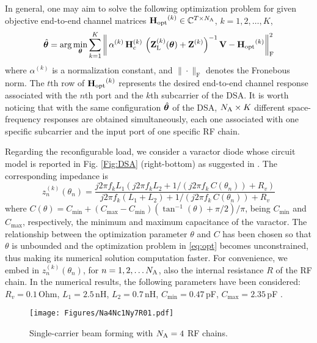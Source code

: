 \documentclass[10pt, final, twocolumn, twoside, romanappendices]{IEEEtran}
\begin{document}
In general, one may aim to solve the following  optimization problem for given objective end-to-end channel matrices  ${\bf{H}_{\mathrm{opt}}}^{(k)} \in \mathbb{C}^{T \times N_{\text{A}}}$, $k=1,2, \ldots, K$,   
%
\begin{equation} \label{eq:opt}
\hat{\boldsymbol{\theta}}=\arg \min_{\boldsymbol{\theta}} \sum_{k=1}^K \left\|\, \alpha^{(k)} \, {\bf{H}}_c^{(k)} \,   \left ( {\bf{Z}}_{\text{L}}^{(k)}(\boldsymbol{\theta})  +{\bf{Z}}^{(k)}  \right )^{-1} {\bf{V}} -   {\bf{H}_{\mathrm{opt}}}^{(k)} \right\|^2_{\mathrm{F}}   
\end{equation}
%
where $\alpha^{(k)}$ is a normalization constant, and $\| \cdot \|_{\mathrm{F}}$ denotes the Fronebous norm.
The $t$th row of ${\bf{H}_{\mathrm{opt}}}^{(k)}$ represents the desired end-to-end channel response associated with the $n$th port and the $k$th subcarrier of the \ac{DSA}. It is worth noticing that with the same configuration $\hat{\boldsymbol{\theta}}$ of the \ac{DSA}, $N_{\text{A}} \times K$ different space-frequency responses are obtained simultaneously, each one associated with one specific subcarrier and the input port of one specific \ac{RF} chain.  
 
Regarding the reconfigurable load, we consider a varactor diode whose circuit model is reported in Fig. \ref{Fig:DSA} (right-bottom) as suggested in  \cite{SamRuiQinCha:20}. 
The corresponding impedance is
%
\begin{equation}
z_n^{(k)}(\theta_n)=\frac{j 2 \pi f_k L_1 (j 2 \pi f_k  L_2+1/(j 2 \pi f_k \, C(\theta_n))+R_v)}{j 2 \pi f_k (L_1+L_2)+1/(j 2 \pi f_k \, C(\theta_n))+R_v} 
\end{equation}
%
where $C(\theta)=C_{\text{min}}+(C_{\text{max}}-C_{\text{min}}) (\tan^{-1}(\theta)+\pi/2)/\pi$, being $C_{\text{min}}$ and $C_{\text{max}}$, respectively, the minimum and maximum capacitance of the varactor. The relationship between the optimization parameter $\theta$ and $C$ has been chosen so that $\theta$ is unbounded and the optimization problem in \eqref{eq:opt} becomes unconstrained, thus making its numerical solution computation faster.   
For convenience, we embed in $z_n^{(k)}(\theta_n)$, for $n=1,2, \ldots N_{\text{A}}$, also the internal resistance $R$ of the \ac{RF} chain. In the numerical results, the following parameters have been considered: $R_v=0.1\,$Ohm, $L_1=2.5\,$nH, $L_2=0.7 \,$nH, $C_{\text{min}}=0.47\,$pF, $C_{\text{max}}=2.35\,$pF \cite{SamRuiQinCha:20}.
 

\begin{figure}[t]
  \centering
  \texttt{[image: Figures/Na4Nc1Ny7R01.pdf]}
  \caption{Single-carrier beam forming with $N_{\text{A}}=4$ \ac{RF} chains.}
  \label{Fig:PatternDSAMono}
\end{figure}
\end{document}

